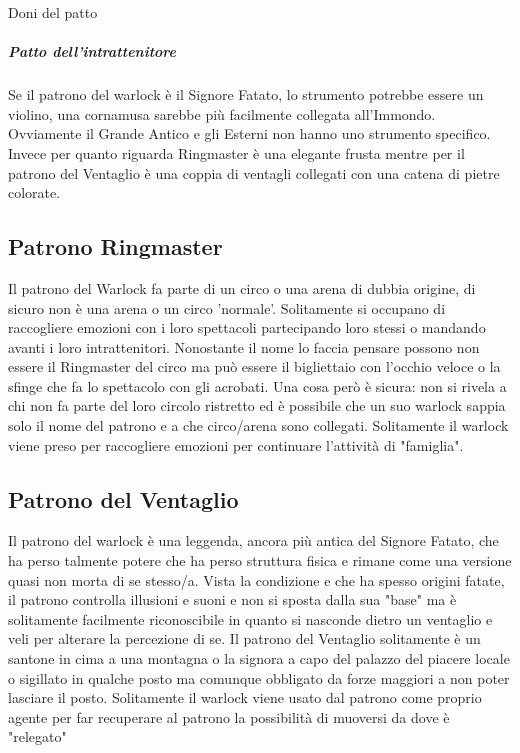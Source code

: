 \begin{DndSidebar}[float=!h]{Doni del patto}
	\subparagraph{Patto dell'intrattenitore}
   Se il patrono del warlock è il Signore Fatato, lo strumento potrebbe essere un violino, una cornamusa sarebbe più facilmente collegata all'Immondo.
   Ovviamente il Grande Antico e gli Esterni non hanno uno strumento specifico.
   Invece per quanto riguarda Ringmaster è una elegante frusta mentre per il patrono del Ventaglio è una coppia di ventagli collegati con una catena di pietre colorate.
\end{DndSidebar}

\subsection{Patrono Ringmaster}
Il patrono del Warlock fa parte di un circo o una arena di dubbia origine, di sicuro non è una arena o un circo 'normale'. Solitamente si occupano di raccogliere emozioni con i loro spettacoli partecipando loro stessi o mandando avanti i loro intrattenitori. Nonostante il nome lo faccia pensare possono non essere il Ringmaster del circo ma può essere il bigliettaio con l'occhio veloce o la sfinge che fa lo spettacolo con gli acrobati. Una cosa però è sicura: non si rivela a chi non fa parte del loro circolo ristretto ed è possibile che un suo warlock sappia solo il nome del patrono e a che circo/arena sono collegati.
Solitamente il warlock viene preso per raccogliere emozioni per continuare l'attività di "famiglia".

\subsection{Patrono del Ventaglio}

Il patrono del warlock è una leggenda, ancora più antica del Signore Fatato, che ha perso talmente potere che ha perso struttura fisica e rimane come una versione quasi non morta di se stesso/a. Vista la condizione e che ha spesso origini fatate, il patrono controlla illusioni e suoni e non si sposta dalla sua "base" ma è solitamente facilmente riconoscibile in quanto si nasconde dietro un ventaglio e veli per alterare la percezione di se.
Il patrono del Ventaglio solitamente è un santone in cima a una montagna o la signora a capo del palazzo del piacere locale o sigillato in qualche posto ma comunque obbligato da forze maggiori a non poter lasciare il posto. Solitamente il warlock viene usato dal patrono come proprio agente per far recuperare al patrono la possibilità di muoversi da dove è "relegato"
